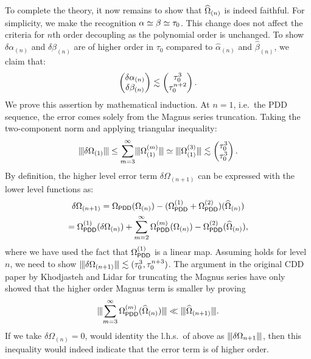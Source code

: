 \documentclass[twocolumn,pra,superscriptaddress]{revtex4-2}
\newcommand{\Opdd}{\Omega_{\mathsf{PDD}}}
\begin{document}
{To complete the theory, it now remains to show that $\widehat{\Omega}_{(n)}$ is indeed faithful. For simplicity, we make the recognition $\alpha\simeq\beta\simeq\tau_0$.
This change does not affect the criteria for $n$th order decoupling as the polynomial order is unchanged. To show $\delta\alpha_{(n)}$ and $\delta\beta_{(n)}$ are of higher order in $\tau_0$ compared to $\widehat\alpha_{(n)}$ and $\widehat\beta_{(n)}$, we claim that:
\begin{equation}\label{eq:cdd-error-bounds}
\begin{pmatrix}
\delta\alpha_{(n)}\\
\delta\beta_{(n)} 
\end{pmatrix}
\lesssim
\begin{pmatrix}
\tau_0^3\\
\tau_0^{n+2} 
\end{pmatrix}.
\end{equation}
We prove this assertion by mathematical induction.
At $n=1$,  i.e.\ the PDD sequence, the error comes solely from the Magnus series truncation.
Taking the two-component norm and applying triangular inequality:
\begin{equation}
\opnorm{\delta\Omega_{(1)}}\le\sum_{m=3}^\infty \opnorm{\Omega_{(1)}\up{m}}
\simeq \opnorm{\Omega_{(1)}\up{3}} \lesssim
\begin{pmatrix}
\Dt^3\\
\Dt^3
\end{pmatrix}.
\end{equation}
By definition, the higher level error term $\delta\Omega_{(n+1)}$ can be 
expressed with the lower level functions as:
\begin{multline}\label{eq:error update}
\delta\Omega_{(n+1)} 
=\Opdd(\Omega_{(n)})-(\Opdd\up{1}+\Opdd\up{2})(\Ohat_{(n)})\\
= \Opdd\up{1}(\delta\Omega_{(n)})+ \sum_{m=2}^\infty \Opdd\up{m}(\Omega_{(n)})-\Opdd\up{2}(\Ohat_{(n)}),
\end{multline} 
where we have used the fact that $\Opdd\up{1}$ is a linear map. Assuming   holds for level $n$, we need to show $\opnorm{\delta\Omega_{(n+1)}}\lesssim(\Dt^3,\Dt^{n+3})$.
The argument in the original CDD paper by Khodjasteh and Lidar for truncating the Magnus series have only showed that the higher order Magnus term is smaller by proving
\begin{equation*}
    \opnorm{ \sum_{m=3}^\infty\Opdd\up{m}(\Ohat_{(n)}) } \ll \opnorm{\Ohat_{(n+1)}}.
\end{equation*}
If we take $\delta\Omega_{(n)}=0$,  would identity the l.h.s.\  of above as $\opnorm{\delta \Omega_{n+1}}$, then this inequality would indeed indicate that the error term is of higher order.
}
\end{document}
